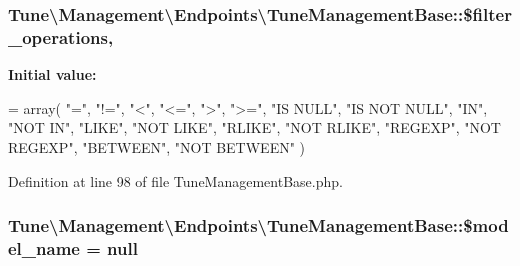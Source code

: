 \hypertarget{classTune_1_1Management_1_1Endpoints_1_1TuneManagementBase_aa2978af944f1ef9318d7ee256c31b61f}{
\subsubsection[{\$filter\-\_\-operations}]{\setlength{\rightskip}{0pt plus 5cm}Tune\textbackslash{}\-Management\textbackslash{}\-Endpoints\textbackslash{}\-Tune\-Management\-Base\-::\$filter\-\_\-operations\hspace{0.3cm}{\ttfamily [static]}, {\ttfamily [protected]}}}\label{classTune_1_1Management_1_1Endpoints_1_1TuneManagementBase_aa2978af944f1ef9318d7ee256c31b61f}
{\bfseries Initial value\-:}
\begin{DoxyCode}
= array(
            \textcolor{stringliteral}{"="},
            \textcolor{stringliteral}{"!="},
            \textcolor{stringliteral}{"<"},
            \textcolor{stringliteral}{"<="},
            \textcolor{stringliteral}{">"},
            \textcolor{stringliteral}{">="},
            \textcolor{stringliteral}{"IS NULL"},
            \textcolor{stringliteral}{"IS NOT NULL"},
            \textcolor{stringliteral}{"IN"},
            \textcolor{stringliteral}{"NOT IN"},
            \textcolor{stringliteral}{"LIKE"},
            \textcolor{stringliteral}{"NOT LIKE"},
            \textcolor{stringliteral}{"RLIKE"},
            \textcolor{stringliteral}{"NOT RLIKE"},
            \textcolor{stringliteral}{"REGEXP"},
            \textcolor{stringliteral}{"NOT REGEXP"},
            \textcolor{stringliteral}{"BETWEEN"},
            \textcolor{stringliteral}{"NOT BETWEEN"}
        )
\end{DoxyCode}


Definition at line 98 of file Tune\-Management\-Base.\-php.

\hypertarget{classTune_1_1Management_1_1Endpoints_1_1TuneManagementBase_aacb981c5880ac450685646f7172b6773}{
\subsubsection[{\$model\-\_\-name}]{\setlength{\rightskip}{0pt plus 5cm}Tune\textbackslash{}\-Management\textbackslash{}\-Endpoints\textbackslash{}\-Tune\-Management\-Base\-::\$model\-\_\-name = null\hspace{0.3cm}{\ttfamily [protected]}}}\label{classTune_1_1Management_1_1Endpoints_1_1TuneManagementBase_aacb981c5880ac450685646f7172b6773}


